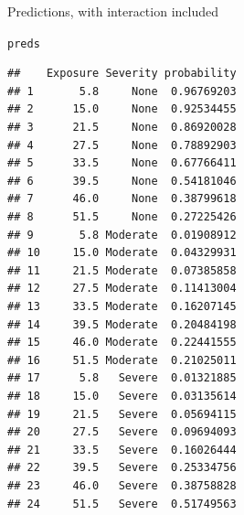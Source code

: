 \documentclass[unknownkeysallowed]{beamer}\usepackage[]{graphicx}\usepackage[]{color}
\makeatletter
\newcommand{\hlstd}[1]{\textcolor[rgb]{0.345,0.345,0.345}{#1}}%
\newenvironment{kframe}{%
 \def\at@end@of@kframe{}%
 \ifinner\ifhmode%
  \def\at@end@of@kframe{\end{minipage}}%
  \begin{minipage}{\columnwidth}%
 \fi\fi%
 \def\FrameCommand##1{\hskip\@totalleftmargin \hskip-\fboxsep
 \colorbox{shadecolor}{##1}\hskip-\fboxsep
     \hskip-\linewidth \hskip-\@totalleftmargin \hskip\columnwidth}%
 \MakeFramed {\advance\hsize-\width
   \@totalleftmargin\z@ \linewidth\hsize
   \@setminipage}}%
 {\par\unskip\endMakeFramed%
 \at@end@of@kframe}
\newenvironment{knitrout}{}{} %
\makeatother
\begin{document}
\begin{frame}[fragile]{Predictions, with interaction included}
\begin{multicols}{2}
\begin{knitrout}
\begin{kframe}
{\ttfamily\noindent\bfseries\color{errorcolor}{\#\# Error in dots\_values(...): object 'pred' not found}}\begin{alltt}
\hlstd{preds}
\end{alltt}
\begin{verbatim}
##    Exposure Severity probability
## 1       5.8     None  0.96769203
## 2      15.0     None  0.92534455
## 3      21.5     None  0.86920028
## 4      27.5     None  0.78892903
## 5      33.5     None  0.67766411
## 6      39.5     None  0.54181046
## 7      46.0     None  0.38799618
## 8      51.5     None  0.27225426
## 9       5.8 Moderate  0.01908912
## 10     15.0 Moderate  0.04329931
## 11     21.5 Moderate  0.07385858
## 12     27.5 Moderate  0.11413004
## 13     33.5 Moderate  0.16207145
## 14     39.5 Moderate  0.20484198
## 15     46.0 Moderate  0.22441555
## 16     51.5 Moderate  0.21025011
## 17      5.8   Severe  0.01321885
## 18     15.0   Severe  0.03135614
## 19     21.5   Severe  0.05694115
## 20     27.5   Severe  0.09694093
## 21     33.5   Severe  0.16026444
## 22     39.5   Severe  0.25334756
## 23     46.0   Severe  0.38758828
## 24     51.5   Severe  0.51749563
\end{verbatim}
\end{kframe}
\end{knitrout}
  
  \end{multicols}

\end{frame}
\end{document}
